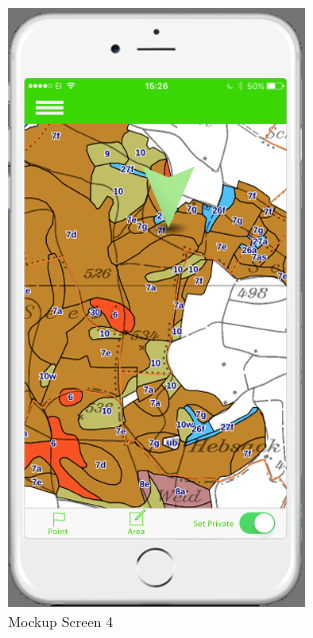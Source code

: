 \begin{figure}[H]
\centering
    \includegraphics[width=0.7\textwidth]{mockup1-4}
    \caption{Mockup Screen 4}
    \label{fig:mesh4}
\end{figure}

